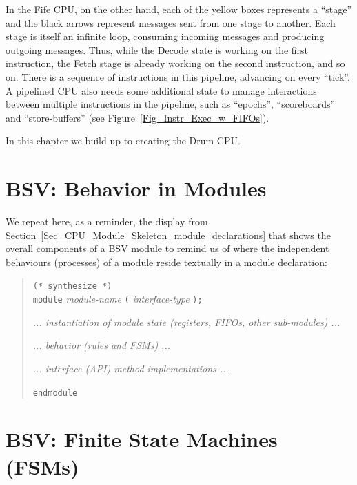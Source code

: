 In the Fife CPU, on the other hand, each of the yellow boxes
represents a ``stage'' and the black arrows represent messages sent
from one stage to another.  Each stage is itself an infinite loop,
consuming incoming messages and producing outgoing messages.  Thus,
while the Decode state is working on the first instruction, the Fetch
stage is already working on the second instruction, and so on.  There
is a sequence of instructions in this pipeline, advancing on every
``tick''.  A pipelined CPU also needs some additional state to manage
interactions between multiple instructions in the pipeline, such as
``epochs'', ``scoreboards'' and ``store-buffers'' (see
Figure~\ref{Fig_Instr_Exec_w_FIFOs}).

In this chapter we build up to creating the Drum CPU.


\section{BSV: Behavior in Modules}

\label{Sec_FSMs_Behavior}


We repeat here, as a reminder, the display from
Section~\ref{Sec_CPU_Module_Skeleton_module_declarations} that shows
the overall components of a BSV module to remind us of where the
independent behaviours (processes) of a module reside textually in a
module declaration:

\begin{quote}
{\tt (* synthesize *)} \\
{\tt module} \emph{module-name} {\tt (} \emph{interface-type} {\tt );}

\hmm \emph{... instantiation of module state (registers, FIFOs, other sub-modules) ...}

\hmm \emph{... behavior (rules and FSMs) ...}

\hmm \emph{... interface (API) method implementations ...}

{\tt endmodule}
\end{quote}


\section{BSV: Finite State Machines (FSMs)}

